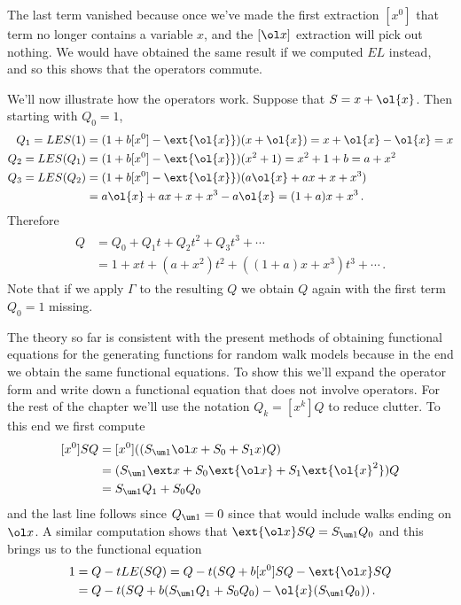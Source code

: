 The last term vanished  because once we've made the first extraction $[x^0]$ that term no longer contains a variable $x$, and the $[\ol x]$ extraction will pick out nothing. We would have obtained the same result if we computed $EL$ instead, and so this shows that the operators commute.
\begin{example} We'll now illustrate how the operators work. Suppose that $S = x + \ol{x}$. Then starting with $Q_0 = 1$,
\begin{align}
Q_1 = LES(1) &= (1+b[x^0]-\ext{\ol{x}})(x+\ol{x}) = x+\ol{x} -\ol{x} = x\\
Q_2 = LES(Q_1) &=  (1+b[x^0]-\ext{\ol{x}})(x^2+1) = x^2 + 1 + b = a + x^2\\
Q_3 = LES(Q_2) &=  (1+b[x^0]-\ext{\ol{x}})(a\ol{x}+ax+x+x^3) \\
&= a\ol{x}+ax+x+x^3 -a\ol{x} = (1+a)x+x^3\,.
\end{align}
Therefore
\begin{align}
\begin{split}
	Q &= Q_0 + Q_1 t +Q_2 t^2+ Q_3t^3 + \cdots\\
	&= 1 + xt + (a+x^2)t^2+((1+a)x+x^3)t^3+ \cdots\,.
\end{split}
\end{align}
Note that if we apply $\Gamma$ to the resulting $Q$ we obtain $Q$ again with the first term $Q_0 = 1$ missing.
\end{example}
The theory so far is consistent with the present methods of obtaining functional equations for the generating functions for random walk models because in the end we obtain the same functional equations. To show this we'll expand the operator form and write down a functional equation that does not involve operators. For the rest of the chapter we'll use the notation $Q_k = [x^k]Q$ to reduce clutter. To this end we first compute
\begin{align}
\begin{split}
	[x^0] SQ &= [x^0]((S_{\um 1}\ol x+S_0 +S_1 x)Q) \\
	& = (S_{\um 1}\ext x +S_0\ext{\ol x} +S_1 \ext{\ol{x}^2})Q\\
	& = S_{\um 1}Q_1 + S_0 Q_0
\end{split}
\end{align}
and the last line follows since $Q_{\um 1}= 0$ since that would include walks ending on $\ol x$. A similar computation shows that $\ext{\ol x}SQ = S_{\um 1} Q_0$ and this brings us to the functional equation
\begin{align}
\begin{split}
	1 &= Q - tLE(SQ) = Q - t(SQ + b[x^0]SQ - \ext{\ol x}SQ\\
	&= Q - t(SQ + b(S_{\um 1}Q_1 + S_0Q_0) - \ol{x}(S_{\um 1}Q_0))\,.
\end{split}
\end{align}

